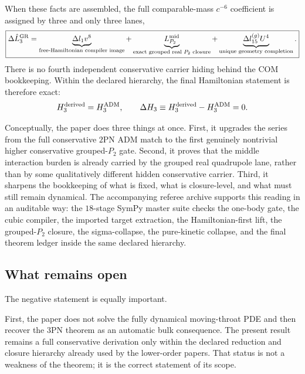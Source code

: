\documentclass[11pt]{article}
\begin{document}
When these facts are assembled, the full comparable-mass $c^{-6}$ coefficient is
assigned by three and only three lanes,
\begin{equation}
\boxed{
\Delta \hat L_3^{\rm GR}
=
\underbrace{\Delta l_1 v^8}_{\text{free-Hamiltonian compiler image}}
+
\underbrace{L_{P_2}^{\rm mid}}_{\text{exact grouped real }P_2\text{ closure}}
+
\underbrace{\Delta l_{15}^{(g)}U^4}_{\text{unique geometry completion}}.
}
\label{eq:conclusions-final-split}
\end{equation}
There is no fourth independent conservative carrier hiding behind the COM
bookkeeping.  Within the declared hierarchy, the final Hamiltonian statement is
therefore exact:
\begin{equation}
H_3^{\rm derived}=H_3^{\rm ADM},
\qquad
\Delta H_3\equiv H_3^{\rm derived}-H_3^{\rm ADM}=0.
\label{eq:conclusions-adm-equality}
\end{equation}

Conceptually, the paper does three things at once.  First, it upgrades the
series from the full conservative $2$PN ADM match to the first genuinely
nontrivial higher conservative grouped-$P_2$ gate.  Second, it proves that the
middle interaction burden is already carried by the grouped real quadrupole
lane, rather than by some qualitatively different hidden conservative carrier.
Third, it sharpens the bookkeeping of what is fixed, what is closure-level, and
what must still remain dynamical.  The accompanying referee archive supports
this reading in an auditable way: the $18$-stage SymPy master suite checks the
one-body gate, the cubic compiler, the imported target extraction, the
Hamiltonian-first lift, the grouped-$P_2$ closure, the sigma-collapse, the
pure-kinetic collapse, and the final theorem ledger inside the same declared
hierarchy.

\subsection{What remains open}
\label{sec:conclusions-open}

The negative statement is equally important.

First, the paper does not solve the fully dynamical moving-throat PDE and then
recover the $3$PN theorem as an automatic bulk consequence.  The present result
remains a full conservative derivation only within the declared reduction and
closure hierarchy already used by the lower-order papers.  That status is not a
weakness of the theorem; it is the correct statement of its scope.
\end{document}
